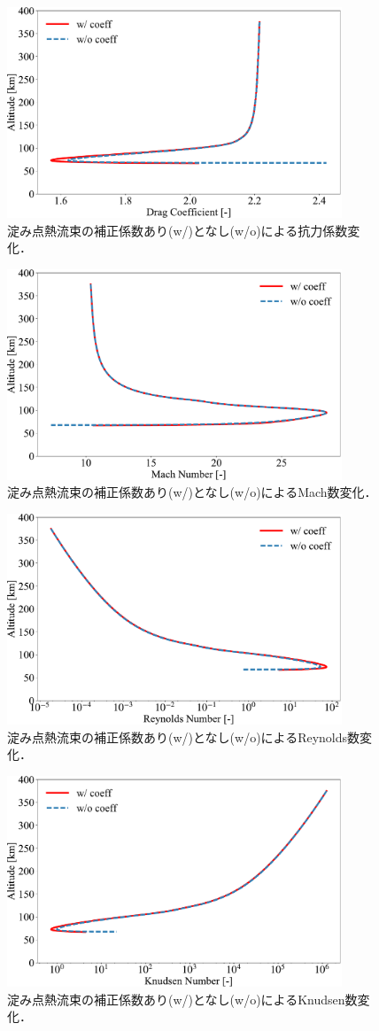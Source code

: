 \begin{figure}[H]
    \centering
    \includegraphics[width=10cm]{fig/couple/heat-coeff/cd.pdf}
    \caption{淀み点熱流束の補正係数あり(w/)となし(w/o)による抗力係数変化．}
    \label{fig:couble-heat-cd}
\end{figure}
\begin{figure}[H]
    \centering
    \includegraphics[width=10cm]{fig/couple/heat-coeff/mach.pdf}
    \caption{淀み点熱流束の補正係数あり(w/)となし(w/o)によるMach数変化．}
    \label{fig:couble-heat-mach}
\end{figure}
\begin{figure}[H]
    \centering
    \includegraphics[width=10cm]{fig/couple/heat-coeff/re.pdf}
    \caption{淀み点熱流束の補正係数あり(w/)となし(w/o)によるReynolds数変化．}
    \label{fig:couble-heat-re}
\end{figure}
\begin{figure}[H]
    \centering
    \includegraphics[width=10cm]{fig/couple/heat-coeff/kn.pdf}
    \caption{淀み点熱流束の補正係数あり(w/)となし(w/o)によるKnudsen数変化．}
    \label{fig:couble-heat-kn}
\end{figure}